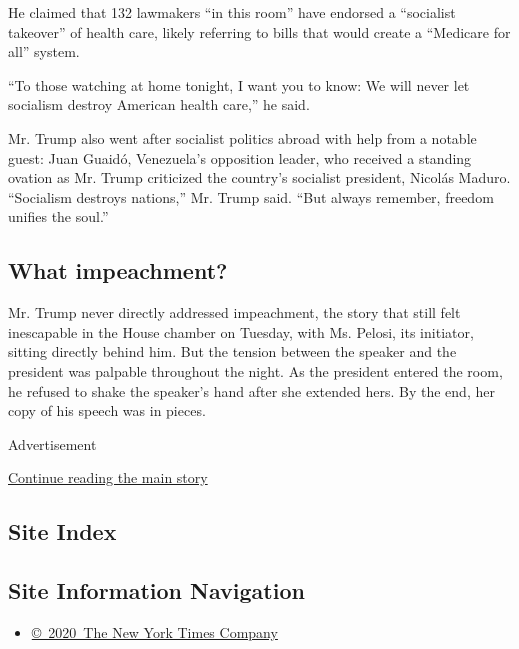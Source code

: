He claimed that 132 lawmakers ``in this room'' have endorsed a
``socialist takeover'' of health care, likely referring to bills that
would create a ``Medicare for all'' system.

``To those watching at home tonight, I want you to know: We will never
let socialism destroy American health care,'' he said.

Mr. Trump also went after socialist politics abroad with help from a
notable guest: Juan Guaidó, Venezuela's opposition leader, who received
a standing ovation as Mr. Trump criticized the country's socialist
president, Nicolás Maduro. ``Socialism destroys nations,'' Mr. Trump
said. ``But always remember, freedom unifies the soul.''

\hypertarget{what-impeachment}{%
\subsection{What impeachment?}\label{what-impeachment}}

Mr. Trump never directly addressed impeachment, the story that still
felt inescapable in the House chamber on Tuesday, with Ms. Pelosi, its
initiator, sitting directly behind him. But the tension between the
speaker and the president was palpable throughout the night. As the
president entered the room, he refused to shake the speaker's hand after
she extended hers. By the end, her copy of his speech was in pieces.

Advertisement

\protect\hyperlink{after-bottom}{Continue reading the main story}

\hypertarget{site-index}{%
\subsection{Site Index}\label{site-index}}

\hypertarget{site-information-navigation}{%
\subsection{Site Information
Navigation}\label{site-information-navigation}}

\begin{itemize}
\tightlist
\item
  \href{https://help.nytimes3xbfgragh.onion/hc/en-us/articles/115014792127-Copyright-notice}{©~2020~The
  New York Times Company}
\end{itemize}

